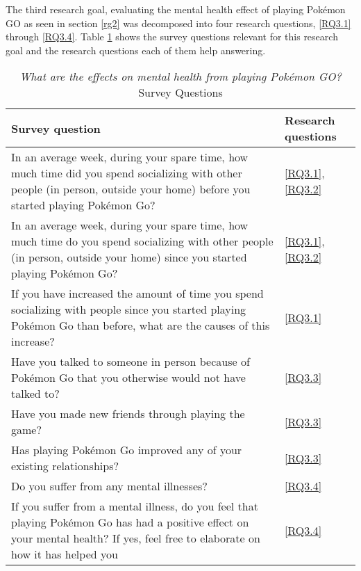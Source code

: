 The third research goal, evaluating the mental health effect of playing Pokémon GO as seen in section \ref{rg2} was decomposed into four research questions, \ref{RQ3.1} through \ref{RQ3.4}. Table \ref{tbl:rg3-survey-questions} shows the survey questions relevant for this research goal and the research questions each of them help answering.

\begin{table}[h]
	\caption{\emph{What are the effects on mental health from playing Pokémon GO?} Survey Questions}
	\centering
	\label{tbl:rg3-survey-questions}
	\begin{tabularx}{\textwidth}{|X|l|}
		\hline
		\textbf{Survey question} & \textbf{Research questions}\\
		\hline\hline
		
		In an average week, during your spare time, how much time did you spend socializing with other people (in person, outside your home) before you started playing Pokémon Go? & \ref{RQ3.1}, \ref{RQ3.2}\\
		\hline
		
		In an average week, during your spare time, how much time do you spend socializing with other people (in person, outside your home) since you started playing Pokémon Go? & \ref{RQ3.1}, \ref{RQ3.2}\\
		\hline
		
		If you have increased the amount of time you spend socializing with people since you started playing Pokémon Go than before, what are the causes of this increase? & \ref{RQ3.1}\\
		\hline
		
		Have you talked to someone in person because of Pokémon Go that you otherwise would not have talked to? & \ref{RQ3.3}\\
		\hline
		
		Have you made new friends through playing the game? & \ref{RQ3.3}\\
		\hline
		
		Has playing Pokémon Go improved any of your existing relationships? & \ref{RQ3.3}\\
		\hline
		
		Do you suffer from any mental illnesses? & \ref{RQ3.4}\\
		\hline
		
		If you suffer from a mental illness, do you feel that playing Pokémon Go has had a positive effect on your mental health? If yes, feel free to elaborate on how it has helped you & \ref{RQ3.4}\\
		\hline
	\end{tabularx}
\end{table}